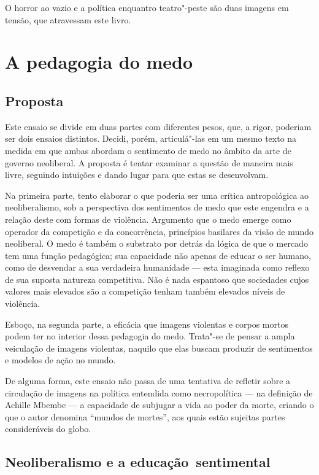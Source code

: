 \asterisc

O horror ao vazio e a política enquantro teatro"-peste são duas imagens em tensão, que atravessam este livro.

\chapter{A pedagogia do medo}

\section*{Proposta}

Este ensaio se divide em duas partes com diferentes pesos, que, a rigor, poderiam ser dois ensaios distintos. Decidi, porém,
articulá"-las em um mesmo texto na medida em que ambas abordam o
sentimento de medo no âmbito da arte de governo neoliberal. A proposta é
tentar examinar a questão de maneira mais livre, seguindo intuições e dando lugar
para que estas se desenvolvam.

Na primeira parte, tento elaborar o que poderia ser uma crítica
antropológica ao neoliberalismo, sob a perspectiva dos sentimentos de medo que
este engendra e a relação deste com formas de violência. Argumento que o medo emerge como operador da competição e
da concorrência, princípios basilares da visão de mundo neoliberal. O
medo é também o substrato por detrás da lógica de que o mercado tem uma
função pedagógica; sua capacidade não apenas de educar o ser humano,
como de desvendar a sua verdadeira humanidade --- esta imaginada como reflexo de
sua suposta natureza competitiva. Não é nada espantoso que sociedades
cujos valores mais elevados são a competição tenham também elevados
níveis de violência.

Esboço, na segunda parte, a eficácia que imagens violentas e corpos
mortos podem ter no interior dessa pedagogia do medo. Trata"-se de pensar
a ampla veiculação de imagens violentas, naquilo que elas buscam
produzir de sentimentos e modelos de ação no mundo.

De alguma forma, este ensaio não
passa de uma tentativa de refletir sobre a circulação de imagens na política
entendida como necropolítica --- na definição de Achille Mbembe --- a capacidade de subjugar a vida ao poder da morte, criando o
que o autor denomina ``mundos de mortes'', aos quais estão sujeitas partes
consideráveis do globo.

\pagebreak

\section*{Neoliberalismo e a educação~sentimental}

